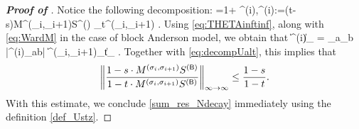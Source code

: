 \begin{proof}[\bf Proof of ]
	Notice the following decomposition:
	\be\label{eq:decompUalt} =1+ \Xi^{(i)},\quad {}\quad \Xi^{(i)}:=(t-s)\cdot M^{(\sig_i,\sig_{i+1})}S^{(\sB)} \Theta_{t}^{(\sig_i,\sig_{i+1})} .\ee
	Using \eqref{eq:THETAinftinf}, along with \eqref{eq:WardM} in the case of block Anderson model, we obtain that
	\be\label{Xi_infint} \|\Xi^{(i)}\|_{\infty\to \infty} = \max_{a}\sum_b |\Xi^{(i)}_{ab}| \le {}\|\Theta^{(\sig_i,\sig_{i+1})}_{t}\|_{\infty\to \infty} \le {}. \ee
	Together with \eqref{eq:decompUalt}, this implies that 
	$$\left\|\frac{1 - s \cdot M^{(\sigma_i,\sigma_{i+1})}S^{({\mathsf{B}})}}{1 - t \cdot M^{(\sigma_i,\sigma_{i+1})}S^{({\mathsf{B}})}}\right\|_{\infty\to \infty}\le \frac{1-s}{1-t} .$$
	With this estimate, we conclude \eqref{sum_res_Ndecay} immediately using the definition \eqref{def_Ustz}. 
	\end{proof}


